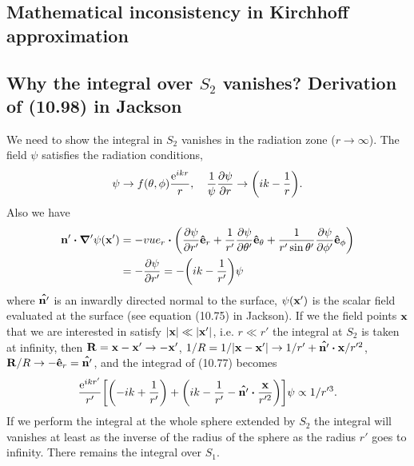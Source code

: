 \documentclass[10pt]{article}
\begin{document}
\subsection{Mathematical inconsistency in Kirchhoff approximation}

\subsection{Why the integral over $S_2$ vanishes? Derivation of (10.98) in Jackson}
We need to show the integral in $S_2$ vanishes in the radiation zone ($r \to \infty$). The field $\psi$ satisfies the radiation conditions,
\begin{equation}
	\psi \to f(\theta, \phi) \frac{\e^{ikr}}{r}\qc \frac{1}{\psi} \pdv{\psi}{r} \to \qty(ik - \frac{1}{r}).
\end{equation}
Also we have
\begin{align*}
	\vb{n'} \vdot \grad'\psi(\vb{x'}) &= -vu{e}_r \vdot \qty(\pdv{\psi}{r'} \vu{e}_r + \frac{1}{r'}\pdv{\psi}{\theta'} \vu{e}_{\theta} + \frac{1}{r' \sin{\theta'}} \pdv{\psi}{\phi'} \vu{e}_{\phi}) \\
	&= -\pdv{\psi}{r'} = -\qty(ik - \frac{1}{r'}) \psi \\
\end{align*}
where $\vu{n'}$ is an inwardly directed normal to the surface, $\psi(\vb{x'})$ is the scalar field evaluated at the surface (see equation (10.75) in Jackson).
If we the field points $\vb{x}$ that we are interested in satisfy $\abs{\vb{x}} \ll \abs{\vb{x'}}$,
i.e. $r \ll r'$ the integral at $S_2$ is taken at infinity,
then $\vb{R} = \vb{x} - \vb{x'} \to -\vb{x'}$, $1/R = 1/\abs{\vb{x} - \vb{x'}} \to 1/r' + \vu{n'}\vdot\vb{x}/r'^2$, $\vb{R}/R \to -\vu{e}_r = \vu{n'}$, and the integrad of (10.77) becomes
\begin{equation}
	\frac{\e^{ikr'}}{r'} \qty[\qty(-ik + \frac{1}{r'}) + \qty(ik - \frac{1}{r'} - \vu{n'}\vdot \frac{\vb{x}}{r'^2})] \psi \propto 1/r'^3.
\end{equation}
If we perform the integral at the whole sphere extended by $S_2$ the integral will vanishes at least as the inverse of the radius of the sphere as the radius $r'$ goes to infinity. There remains the integral over $S_1$.
\end{document}
